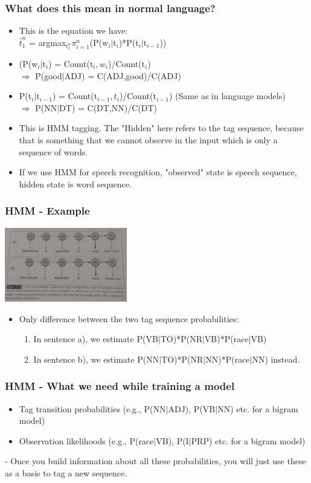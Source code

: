 \documentclass{beamer}
\begin{document}
\begin{frame}
\frametitle{What does this mean in normal language?}
\begin{itemize}
\item This is the equation we have: \\ $\hat t_1^n$ = argmax$_{t_1^n} \pi_{i=1}^n$(P(w$_i|$t$_i$)*P(t$_i|$t$_{i-1}$))
\item (P(w$_i|$t$_i$) = Count(t$_i,w_i$)/Count(t$_i$)
\\ $\Rightarrow$ P(good$|$ADJ) = C(ADJ,good)/C(ADJ)
\item P(t$_i|$t$_{i-1}$) = Count(t$_{i-1},t_i$)/Count(t$_{i-1}$) (Same as in language models)
\\  $\Rightarrow$  P(NN$|$DT) = C(DT,NN)/C(DT)
\item This is HMM tagging. The "Hidden" here refers to the tag sequence, because that is something that we cannot observe in the input which is only a sequence of words.
\item If we use HMM for speech recognition, "observed" state is speech sequence, hidden state is word sequence.
\end{itemize}
\end{frame}

\begin{frame}
\frametitle{HMM - Example}
\includegraphics[width=0.4\textwidth,angle=90]{HMM-1.jpg}
\begin{itemize}
\item Only difference between the two tag sequence probabilities:
\begin{enumerate}
\item In sentence a), we estimate P(VB$|$TO)*P(NR$|$VB)*P(race$|$VB)
\item In sentence b), we estimate P(NN$|$TO)*P(NR$|$NN)*P(race$|$NN) instead.
\end{enumerate}
\end{itemize}
\end{frame}

\begin{frame}
\frametitle{HMM - What we need while training a model}
\begin{itemize}
\item Tag transition probabilities (e.g.,  P(NN$|$ADJ), P(VB$|$NN) etc. for a bigram model)
\item Observation likelihoods (e.g., P(race$|$VB), P(I$|$PRP) etc. for a bigram model)
\end{itemize}
- Once you build information about all these probabilities, you will just use these as a basis to tag a new sequence.
\end{frame}
\end{document}
